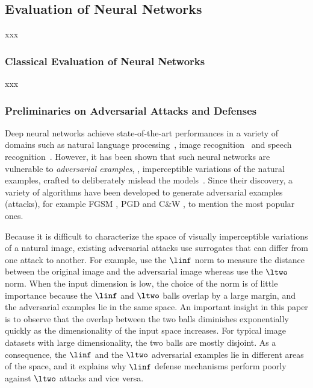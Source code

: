 \subsection{Evaluation of Neural Networks}
\label{subsection:ch2-evaluation_neural_networks}
xxx

\subsubsection{Classical Evaluation of Neural Networks}
\label{section:ch2-preliminaries_adversarial_attacks_and_defenses}
xxx

\subsubsection{Preliminaries on Adversarial Attacks and Defenses}
\label{section:ch2-preliminaries_adversarial_attacks_and_defenses}

Deep neural networks achieve state-of-the-art performances in a variety of domains such as natural language processing~\cite{radford2018Language}, image recognition~\cite{He_2016_CVPR} and speech recognition~\cite{hinton2012deep}.
However, it has been shown that such neural networks are vulnerable to \emph{adversarial examples}, \ie, imperceptible variations of the natural examples, crafted to deliberately mislead the models~\cite{globerson2006nightmare,biggio2013evasion,Szegedy2013IntriguingPO}.
Since their discovery, a variety of algorithms have been developed to generate adversarial examples (\aka attacks), for example FGSM \cite{goodfellow2014explaining}, PGD \cite{madry2018towards} and C\&W \cite{carlini2017towards}, to mention the most popular ones.

Because it is difficult to characterize the space of visually imperceptible variations of a natural image, existing adversarial attacks use surrogates that can differ from one attack to another.
For example, \citet{goodfellow2014explaining} use the $\linf$ norm to measure the distance between the original image and the adversarial image whereas \citet{carlini2017towards} use the $\ltwo$ norm.
When the input dimension is low, the choice of the norm is of little importance because the $\linf$ and $\ltwo$ balls overlap by a large margin, and the adversarial examples lie in the same space.
An important insight in this paper is to observe that the overlap between the two balls  diminishes exponentially quickly as the dimensionality of the input space increases.
For typical image datasets with large dimensionality, the two balls are mostly disjoint.
As a consequence, the $\linf$ and the $\ltwo$ adversarial examples lie in different areas of the space, and it explains why $\linf$ defense mechanisms perform poorly against $\ltwo$ attacks and vice versa. 

